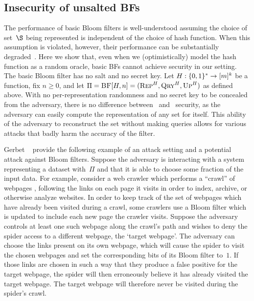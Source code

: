 \subsection{Insecurity of unsalted BFs}\label{sec:bad-bfs}
The performance of basic Bloom filters is well-understood assuming the choice of
set~$\S$ being represented is independent of the choice of hash function. When
this assumption is violated, however, their performance can be substantially
degraded~\cite{gerbet2015power}.
%
Here we show that, even when we (optimistically) model the hash function as a
random oracle, basic BFs cannot achieve security in our setting.
%
The basic Bloom filter has no salt and no secret key.
Let $H:\{0,1\}^*\to[m]^k$ be a function, fix $n\geq0$, and let
$\Pi = \textnormal{\textsc{BF}}[H,n]=(\textnormal{\textsc{Rep}}^H,\textnormal{\textsc{Qry}}^H,\textnormal{\textsc{Up}}^H)$ as defined above.
%
With no per-representation randomness and no secret key to be concealed from the
adversary, there is no difference between \errep\ and \erreps\ security, as the
adversary can easily compute the representation of any set for itself. This
ability of the adversary to reconstruct the set without making queries allows
for various attacks that badly harm the accuracy of the filter.

Gerbet \etal~\cite{gerbet2015power} provide the following example of an attack
setting and a potential attack against Bloom filters.
Suppose the adversary is interacting with a system representing a dataset
with~$\Pi$ and that it is able to choose some fraction of the input data.  For
example, consider a web crawler which performs a ``crawl'' of webpages
, following
the links on each page it visits in order to index, archive, or otherwise
analyze websites. In order to keep track of the set of webpages which have
already been visited during a crawl, some crawlers use a Bloom filter which is
updated to include each new page the crawler visits.
Suppose the adversary controls at least one such webpage along the crawl's path
and wishes to deny the spider access to a different webpage, the `target
webpage'. The adversary can choose the links present on its own webpage, which
will cause the spider to visit the chosen webpages and set the corresponding
bits of its Bloom filter to~$1$. If those links are chosen in such a way that they
produce a false positive for the target webpage, the spider will then
erroneously believe it has already visited the target webpage. The target
webpage will therefore never be visited during the spider's crawl.

